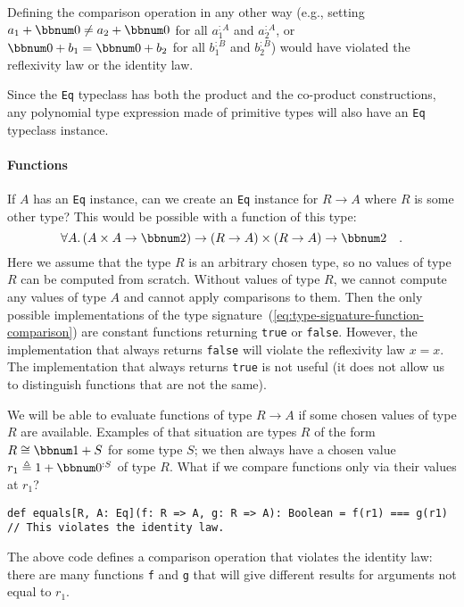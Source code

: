 Defining the comparison operation in any other way (e.g., setting
$a_{1}+\bbnum 0\neq a_{2}+\bbnum 0$ for all $a_{1}^{:A}$ and $a_{2}^{:A}$,
or $\bbnum 0+b_{1}=\bbnum 0+b_{2}$ for all $b_{1}^{:B}$ and $b_{2}^{:B}$)
would have violated the reflexivity law or
the identity law.

Since the \lstinline!Eq! typeclass has both the product and the co-product
constructions, any polynomial type expression made of primitive types
will also have an \lstinline!Eq! typeclass instance.

\paragraph{Functions}

If $A$ has an \lstinline!Eq! instance, can we create an \lstinline!Eq!
instance for $R\rightarrow A$ where $R$ is some other type? This
would be possible with a function of this type:
\begin{equation}
\forall A.\,(A\times A\rightarrow\bbnum 2)\rightarrow\left(R\rightarrow A\right)\times\left(R\rightarrow A\right)\rightarrow\bbnum 2\quad.\label{eq:type-signature-function-comparison}
\end{equation}
Here we assume that the type $R$ is an arbitrary chosen type, so
no values of type $R$ can be computed from scratch. Without values
of type $R$, we cannot compute any values of type $A$ and cannot
apply comparisons to them. Then the only possible implementations
of the type signature~(\ref{eq:type-signature-function-comparison})
are constant functions returning \lstinline!true! or \lstinline!false!.
However, the implementation that always returns \lstinline!false!
will violate the reflexivity law $x=x$. The implementation that always
returns \lstinline!true! is not useful (it does not allow us to distinguish
functions that are not the same).

We will be able to evaluate functions of type $R\rightarrow A$ if
some chosen values of type $R$ are available. Examples of that situation
are types $R$ of the form $R\cong\bbnum 1+S$ for some type $S$;
we then always have a chosen value $r_{1}\triangleq1+\bbnum 0^{:S}$
of type $R$. What if we compare functions only via their values at
$r_{1}$?
\begin{lstlisting}
def equals[R, A: Eq](f: R => A, g: R => A): Boolean = f(r1) === g(r1)  // This violates the identity law.
\end{lstlisting}
The above code defines a comparison operation that violates the identity
law: there are many functions \lstinline!f! and \lstinline!g! that
will give different results for arguments not equal to $r_{1}$. 

